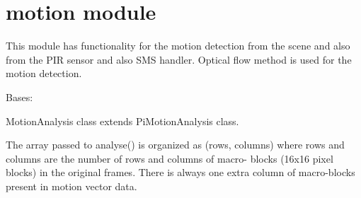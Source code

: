 \documentclass[letterpaper,10pt,english,openany]{sphinxmanual}
\begin{document}
\chapter{motion module}
\label{index:motion-module}
This module has functionality for the motion detection from the scene and also from the PIR sensor
and also SMS handler.
Optical flow method is used for the motion detection.
\label{index:module-rpicameramon.motion}

\begin{fulllineitems}
\label{index:rpicameramon.motion.MotionAnalysis}
Bases: 

MotionAnalysis class extends PiMotionAnalysis class.

The array passed to analyse() is organized as (rows, columns)
where rows and columns are the number of rows and columns of macro-
blocks (16x16 pixel blocks) in the original frames. There is always
one extra column of macro-blocks present in motion vector data.

\begin{fulllineitems}
\label{index:rpicameramon.motion.MotionAnalysis.analyse}
\end{fulllineitems}


\end{fulllineitems}

\end{document}
